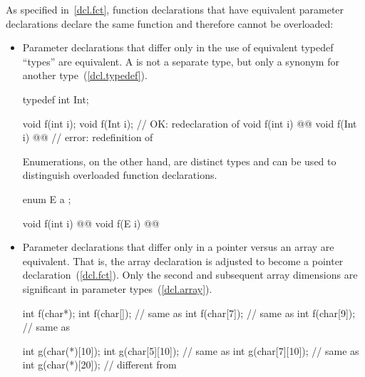 \pnum
{}%
%
\enternote
As specified in~\ref{dcl.fct},
function declarations that have equivalent parameter declarations declare
the same function and therefore cannot
be overloaded:

\begin{itemize}
\item
{}%
Parameter declarations that differ only in the use of equivalent typedef
``types'' are equivalent.
A
is not a separate type, but only a synonym for another type~(\ref{dcl.typedef}).
\enterexample

\begin{codeblock}
typedef int Int;

void f(int i);
void f(Int i);                  // OK: redeclaration of 
void f(int i) @@
void f(Int i) @@    // error: redefinition of 

\end{codeblock}
\exitexample

%
Enumerations, on the other hand, are distinct types and can be used to
distinguish
overloaded function declarations.
\enterexample

\begin{codeblock}
enum E { a };

void f(int i) @@
void f(E i)   @@
\end{codeblock}
\exitexample

\item
{}%
Parameter declarations that differ only in a pointer
\tcode{*}
versus an array
\tcode{[]}
are equivalent.
That is, the array declaration is adjusted to become a pointer
declaration~(\ref{dcl.fct}).
Only the second and subsequent array dimensions are significant in
parameter types~(\ref{dcl.array}).
\enterexample

\begin{codeblock}
int f(char*);
int f(char[]);                  // same as 
int f(char[7]);                 // same as 
int f(char[9]);                 // same as 

int g(char(*)[10]);
int g(char[5][10]);             // same as 
int g(char[7][10]);             // same as 
int g(char(*)[20]);             // different from 
\end{codeblock}
\exitexample


\end{itemize}
